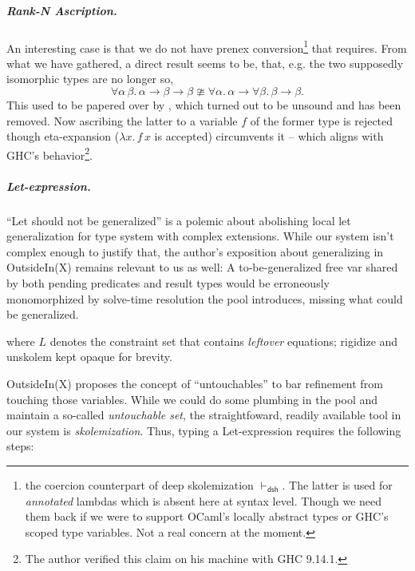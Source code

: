 \documentclass[a4paper, 11pt]{article}
\theoremstyle{remark}
\begin{document}
\begin{mathpar}
\end{mathpar}

\subparagraph{Rank-N Ascription.} An interesting case is that we do not have prenex
conversion\footnote{
  the coercion counterpart of deep skolemization $\vdash_\textsf{dsh}$.
  The latter is used for \emph{annotated} lambdas 
  which is absent here at syntax level. Though we need them back if we were to support OCaml's
  locally abstract types or GHC's scoped type variables. Not a real concern at the moment.
}
that  requires. From what we have gathered, a direct result seems to be, that, e.g.
the two supposedly isomorphic types are no longer so,
\[
  \forall \alpha\,\beta.\,\alpha\to\beta\to\beta \ncong \forall \alpha.\,
  \alpha\to\forall \beta.\,\beta\to\beta.
\]
This used to be papered over by , which turned out to be unsound and has been
removed. Now ascribing the latter to a variable $f$ of the former type is
rejected though eta-expansion ($\lambda x.\,f\,x$ is accepted) circumvents it -- which aligns
with GHC's behavior\footnote{The author verified this claim on his machine with GHC 9.14.1.}.

\subparagraph{Let-expression.}
``Let should not be generalized'' is a polemic about abolishing local let generalization for type system
with complex extensions. While our system isn't complex enough to justify that, the author's exposition
about generalizing in OutsideIn(X) remains relevant to us as well: A to-be-generalized free var shared by both
pending predicates and result types would be erroneously monomorphized by solve-time
resolution the pool introduces, missing what could be generalized.

\begin{mathpar}
\end{mathpar}
where $L$ denotes the constraint set that contains \emph{leftover} equations;
\textsf{rigidize} and \textsf{unskolem} kept opaque for brevity.

OutsideIn(X) proposes the concept of ``untouchables'' to bar refinement from touching those variables.
While we could do some plumbing in the pool and maintain a so-called \emph{untouchable set}, the
straightfoward, readily available tool in our system is \emph{skolemization}. Thus, typing a Let-expression
requires the following steps:
\end{document}
